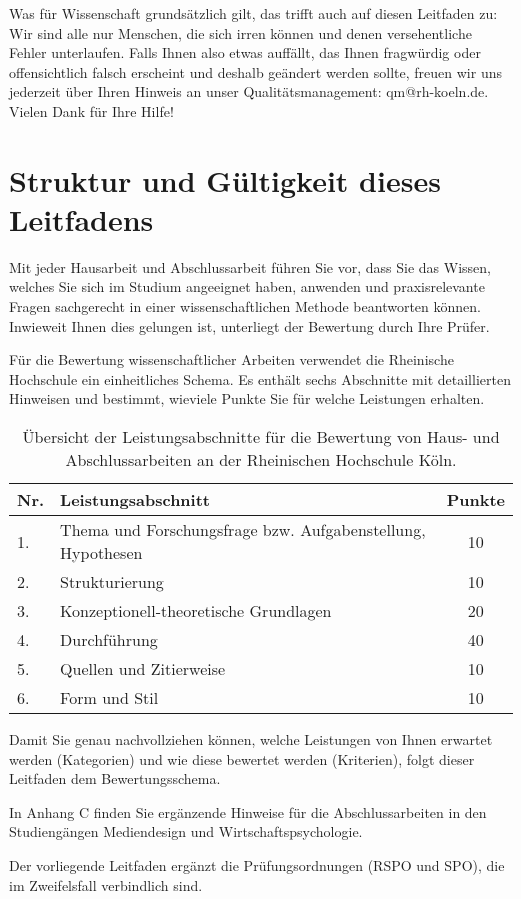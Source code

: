 Was für Wissenschaft grundsätzlich gilt, das trifft auch auf diesen Leitfaden zu: Wir sind alle nur Menschen, die sich irren können und denen versehentliche Fehler unterlaufen. Falls Ihnen also etwas auffällt, das Ihnen fragwürdig oder offensichtlich falsch erscheint und deshalb geändert werden sollte, freuen wir uns jederzeit über Ihren Hinweis an unser Qualitätsmanagement: qm@rh-koeln.de. Vielen Dank für Ihre Hilfe!

\chapter*{Struktur und Gültigkeit dieses Leitfadens}
\label{chap:leitfaden-struktur}

Mit jeder Hausarbeit und Abschlussarbeit führen Sie vor, dass Sie das Wissen, welches Sie sich im Studium angeeignet haben, anwenden und praxisrelevante Fragen sachgerecht in einer wissenschaftlichen Methode beantworten können. Inwieweit Ihnen dies gelungen ist, unterliegt der Bewertung durch Ihre Prüfer.

Für die Bewertung wissenschaftlicher Arbeiten verwendet die Rheinische Hochschule ein einheitliches Schema. Es enthält sechs Abschnitte mit detaillierten Hinweisen und bestimmt, wieviele Punkte Sie für welche Leistungen erhalten.

\begin{table}[h]
\label{tab:leistungsabschnitte}
\begin{tabular}{|l|l|c|}
\hline
\textbf{Nr.} & \textbf{Leistungsabschnitt} & \textbf{Punkte} \\
\hline
1. & Thema und Forschungsfrage bzw. Aufgabenstellung, Hypothesen & 10 \\
\hline
2. & Strukturierung & 10 \\
\hline
3. & Konzeptionell-theoretische Grundlagen & 20 \\
\hline
4. & Durchführung & 40 \\
\hline
5. & Quellen und Zitierweise & 10 \\
\hline
6. & Form und Stil & 10 \\
\hline
\end{tabular}
\caption{Übersicht der Leistungsabschnitte für die Bewertung von Haus- und Abschlussarbeiten an der Rheinischen Hochschule Köln.}
\end{table}

Damit Sie genau nachvollziehen können, welche Leistungen von Ihnen erwartet werden (Kategorien) und wie diese bewertet werden (Kriterien), folgt dieser Leitfaden dem Bewertungsschema.

In Anhang C finden Sie ergänzende Hinweise für die Abschlussarbeiten in den Studiengängen Mediendesign und Wirtschaftspsychologie.

Der vorliegende Leitfaden ergänzt die Prüfungsordnungen (RSPO und SPO), die im Zweifelsfall verbindlich sind.